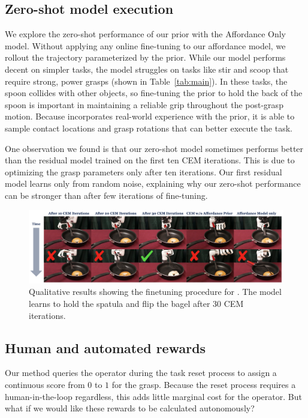 \subsection{Zero-shot model execution} 
We explore the zero-shot performance of our prior with the Affordance Only model.  Without applying any online fine-tuning to our affordance model, we rollout the trajectory parameterized by the prior.  While our model performs decent on simpler tasks, the model struggles on tasks like stir and scoop that require strong, power grasps (shown in Table~\ref{tab:main}). In these tasks, the spoon collides with other objects, so fine-tuning the prior to hold the back of the spoon is important in maintaining a reliable grip throughout the post-grasp motion. Because \ours incorporates real-world experience with the prior, it is able to sample contact locations and grasp rotations that can better execute the task. 

One observation we found is that our zero-shot model sometimes performs better than the residual model trained on the first ten CEM iterations. This is due to \ours optimizing the grasp parameters only after ten iterations. Our first residual model learns only from random noise, explaining why our zero-shot performance can be stronger than \ours after few iterations of fine-tuning.


\begin{figure}[t]
\centering
\includegraphics[width=\linewidth]{figs/qual_results.pdf}
\vspace{-0.2in}
  \caption{\small Qualitative results showing the finetuning procedure for \ours.  The model learns to hold the spatula and flip the bagel after 30 CEM iterations. }
 \label{fig:task_bagel}
 \vspace{-0.15in}
\end{figure}


\subsection{Human and automated rewards}
Our method queries the operator during the task reset process to assign a continuous score from $0$ to $1$ for the grasp.  Because the reset process requires a human-in-the-loop regardless, this adds little marginal cost for the operator.  But what if we would like these rewards to be calculated autonomously?  

